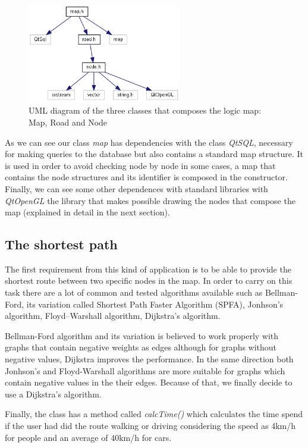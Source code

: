 \documentclass{article}
\begin{document}
\begin{figure}[h]
\centering
\includegraphics[width=0.6\textwidth]{map.png}
\caption{UML diagram of the three classes that composes the logic map: Map, Road and Node}
\end{figure}

As we can see our class \textit{map} has dependencies with the class \textit{QtSQL}, necessary for making queries to the database but also contains a standard map structure. It is used in order to avoid checking node by node in some cases, a map that contains the node structures and its identifier is composed in the constructor. Finally, we can see some other dependences with standard libraries with \textit{QtOpenGL} the library that makes possible drawing the nodes that compose the map (explained in detail in the next section).

\subsection{The shortest path}
The first requirement from this kind of application is to be able to provide the shortest route between two specific nodes in the map. In order to carry on this task there are a lot of common and tested algorithms available such as Bellman-Ford, its variation called  Shortest Path Faster Algorithm (SPFA), Jonhson's algorithm, Floyd–Warshall algorithm, Dijkstra's algorithm.

Bellman-Ford algorithm and its variation is believed to work properly with graphs that contain negative weights as edges although for graphs without negative values, Dijkstra improves the performance. In the same direction both Jonhson's and Floyd-Warshall algorithms are more suitable for graphs which contain negative values in the their edges. Because of that, we finally decide to use a Dijkstra's algorithm.

Finally, the class has a method called \textit{calcTime()} which calculates the time spend if the user had did the route walking or driving considering the speed as 4km/h for people and an average of 40km/h for cars.
\end{document}
